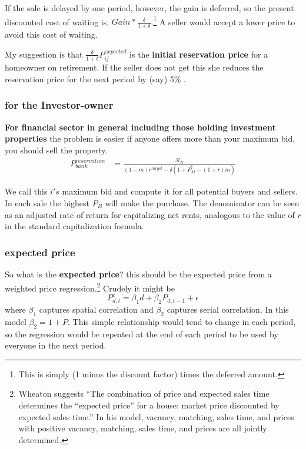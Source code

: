 If the sale is delayed by one period, however, the gain is deferred, so the present discounted cost of waiting is, $Gain*\frac{\delta}{1+\delta}$.\footnote{This is simply (1 minus the discount factor) times the deferred amount.} A seller would accept a lower price to avoid this cost of waiting. 

My suggestion is that $\frac{\delta}{1+\delta}P_{ij}^{expected}$ is the \textbf{initial reservation price} for a homeowner on retirement. If the seller does not get this she reduces the reservation price for the next period by (say) 5\% .


\subsubsection{for the Investor-owner}
\textbf{For financial sector in general including those holding investment properties} the problem is easier if anyone offers more than your maximum bid, you should sell the property. 
\begin{eqnarray}
P_{bank}^{reservation} & =    \frac{\mathcal{R}_N}{(1-m)r^{target}-\delta \left(1 + \dot P_M^e - (1+r)m\right)} \label{eqn-res-price-B} \end{eqnarray}

We call this  $i's$ maximum bid and compute it for all potential buyers and sellers. In each sale the highest $P_B$ will make the purchase. The denominator can be seen as an adjusted rate of return for capitalizing net rents, analogous to the value of $r$ in  the standard capitalization formula. 



\subsubsection{expected price}
So what is the \textbf{expected price}? this should be the expected price from a weighted price regression.\footnote{Wheaton \cite{wheatonVacancySearchPrices1990} suggests ``The combination of price and expected sales time determines the ``expected price'' for a house: market price discounted by expected sales time.'' In his model, vacancy, matching, sales time, and prices with positive vacancy, matching, sales time, and prices are all jointly determined.} Crudely it might be
\[P_{d,t}^e=\beta_1 d + \beta_2 P_{d,t-1} +\epsilon\]
where $\beta_1$ captures spatial correlation and $\beta_2$ captures serial correlation. In this model $\beta_2=1+\dot P$. This simple relationship would tend to change in each period, so the regression would be repeated  at the end of each period  to be used by everyone in the next period. 

